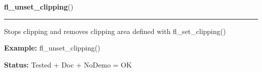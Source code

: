 \hspace{.8\funcindent}\begin{boxedminipage}{\funcwidth}

    \raggedright \textbf{fl\_unset\_clipping}()

    \vspace{-1.5ex}

    \rule{\textwidth}{0.5\fboxrule}
\setlength{\parskip}{2ex}
    Stops clipping and removes clipping area defined with 
    fl\_set\_clipping()

\setlength{\parskip}{1ex}
\textbf{Example:} fl\_unset\_clipping()



\textbf{Status:} Tested + Doc + NoDemo = OK



    \end{boxedminipage}

    \label{xformslib:flxbasic:fl_set_text_clipping}

    \vspace{0.5ex}

